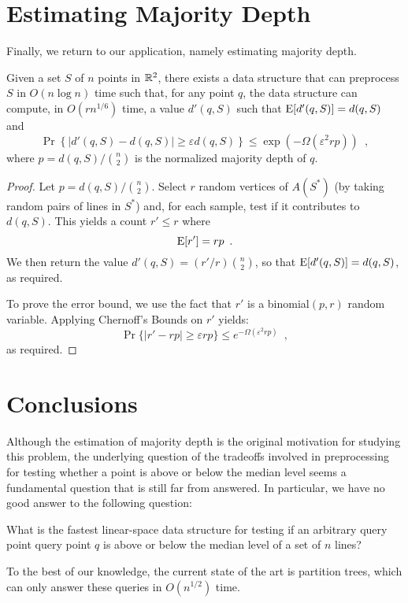\documentclass{cccg12}
\newcommand{\eps}{\varepsilon}
\begin{document}
\section{Estimating Majority Depth}

Finally, we return to our application, namely estimating majority depth. 

\begin{thm}
  Given a set $S$ of $n$ points in $\mathbb{R}^2$, there exists a data structure
  that can preprocess $S$ in $O(n\log n)$ time such that, for any point
  $q$, the data structure can compute, in $O(rn^{1/6})$ time, a value
  $d'(q,S)$ such that $\mathrm{E}[d'(q,S)]=d(q,S)$ and
  \[
     \Pr\left\{|d'(q,S)-d(q,S)| \ge \eps d(q,S)\right\} 
        \le \exp\left(-\Omega\left(\eps^2rp\right)\right) \enspace ,
  \]
  where $p=d(q,S)/\binom{n}{2}$ is the normalized majority depth of $q$.
\end{thm}

\begin{proof}
  Let $p=d(q,S)/\binom{n}{2}$.
  Select $r$ random vertices of $A(S^*)$ (by taking random pairs of lines
  in $S^*$) and, for each sample, test if it contributes to $d(q,S)$.  This
  yields a count $r' \le r$ where
  \[ 
     \mathrm{E}[r'] = rp \enspace .
  \]
  We then return the value $d'(q,S)=(r'/r)\binom{n}{2}$, so that
  $\mathrm{E}[d'(q,S)]=d(q,S)$, as required.

  To prove the error bound, we use the fact that $r'$ is a binomial$(p,r)$ random variable.  Applying Chernoff's Bounds on $r'$ yields:
  \[
     \Pr\{|r' - rp| \ge \eps rp\} \le e^{-\Omega(\eps^2rp)} \enspace ,
  \]
  as required.
\end{proof}

\section{Conclusions}

Although the estimation of majority depth is the original motivation for
studying this problem, the underlying question of the tradeoffs involved
in preprocessing for testing whether a point is above or below the median
level seems a fundamental question that is still far from answered.  In particular, we have no good answer to the following question:

\begin{op}
What is the fastest linear-space data structure for testing if an
arbitrary query point query point $q$ is above or below the median level
of a set of $n$ lines?
\end{op}

To the best of our knowledge, the current state of the art is partition
trees, which can only answer these queries in $O(n^{1/2})$ time.



\end{document}
